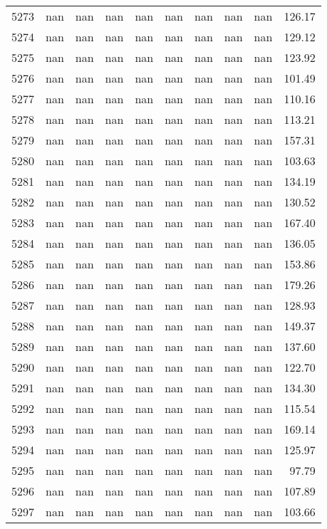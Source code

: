 \begin{tabular}{lrrrrrrrrr}
5273 & nan & nan & nan & nan & nan & nan & nan & nan & 126.17 \\
5274 & nan & nan & nan & nan & nan & nan & nan & nan & 129.12 \\
5275 & nan & nan & nan & nan & nan & nan & nan & nan & 123.92 \\
5276 & nan & nan & nan & nan & nan & nan & nan & nan & 101.49 \\
5277 & nan & nan & nan & nan & nan & nan & nan & nan & 110.16 \\
5278 & nan & nan & nan & nan & nan & nan & nan & nan & 113.21 \\
5279 & nan & nan & nan & nan & nan & nan & nan & nan & 157.31 \\
5280 & nan & nan & nan & nan & nan & nan & nan & nan & 103.63 \\
5281 & nan & nan & nan & nan & nan & nan & nan & nan & 134.19 \\
5282 & nan & nan & nan & nan & nan & nan & nan & nan & 130.52 \\
5283 & nan & nan & nan & nan & nan & nan & nan & nan & 167.40 \\
5284 & nan & nan & nan & nan & nan & nan & nan & nan & 136.05 \\
5285 & nan & nan & nan & nan & nan & nan & nan & nan & 153.86 \\
5286 & nan & nan & nan & nan & nan & nan & nan & nan & 179.26 \\
5287 & nan & nan & nan & nan & nan & nan & nan & nan & 128.93 \\
5288 & nan & nan & nan & nan & nan & nan & nan & nan & 149.37 \\
5289 & nan & nan & nan & nan & nan & nan & nan & nan & 137.60 \\
5290 & nan & nan & nan & nan & nan & nan & nan & nan & 122.70 \\
5291 & nan & nan & nan & nan & nan & nan & nan & nan & 134.30 \\
5292 & nan & nan & nan & nan & nan & nan & nan & nan & 115.54 \\
5293 & nan & nan & nan & nan & nan & nan & nan & nan & 169.14 \\
5294 & nan & nan & nan & nan & nan & nan & nan & nan & 125.97 \\
5295 & nan & nan & nan & nan & nan & nan & nan & nan & 97.79 \\
5296 & nan & nan & nan & nan & nan & nan & nan & nan & 107.89 \\
5297 & nan & nan & nan & nan & nan & nan & nan & nan & 103.66 \\

\end{tabular}
